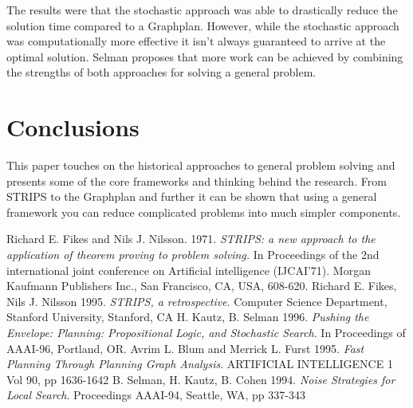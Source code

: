 \documentclass[paper=letter, fontsize=12pt]{article}
\begin{document}
The results were that the stochastic approach was able to drastically reduce the solution time compared to a Graphplan. However, while the stochastic approach was computationally more effective it isn't always guaranteed to arrive at the optimal solution. Selman proposes that more work can be achieved by combining the strengths of both approaches for solving a general problem.

\section{Conclusions}

This paper touches on the historical approaches to general problem solving and presents some of the core frameworks and thinking behind the research. From STRIPS to the Graphplan and further it can be shown that using a general framework you can reduce complicated problems into much simpler components.

\begin{thebibliography}{99}
Richard E. Fikes and Nils J. Nilsson. 1971. \textit{STRIPS: a new approach to the application of theorem proving to problem solving.} In Proceedings of the 2nd international joint conference on Artificial intelligence (IJCAI'71). Morgan Kaufmann Publishers Inc., San Francisco, CA, USA, 608-620.
Richard E. Fikes, Nils J. Nilsson  1995. \textit{STRIPS, a retrospective}. Computer Science Department, Stanford University, Stanford, CA
H. Kautz, B. Selman 1996. \textit{Pushing the Envelope: Planning: Propositional Logic, and Stochastic Search}. In Proceedings of AAAI-96, Portland, OR.
Avrim L. Blum and Merrick L. Furst 1995. \textit{Fast Planning Through Planning Graph Analysis}. ARTIFICIAL INTELLIGENCE 1 Vol 90, pp 1636-1642
B. Selman, H. Kautz, B. Cohen 1994. \textit{Noise Strategies for Local Search}. Proceedings AAAI-94, Seattle, WA, pp 337-343
\end{thebibliography}

\end{document}
